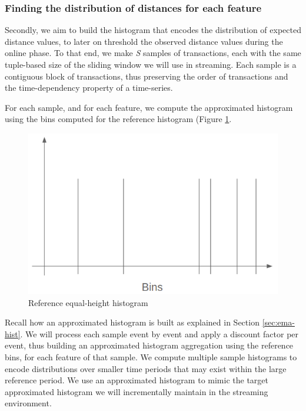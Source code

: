 \subsubsection*{Finding the distribution of distances for each feature} \label{sec:sampling-batch}
Secondly, we aim to build the histogram that encodes the distribution of expected distance values, to later on threshold the observed distance values during the online phase. To that end, we make \textit{S} samples of transactions, each with the same tuple-based size of the sliding window we will use in streaming. Each sample is a contiguous block of transactions, thus preserving the order of transactions and the time-dependency property of a time-series. 

For each sample, and for each feature, we compute the approximated histogram using the bins computed for the reference histogram (Figure \ref{fig:ref-hist-bins}.

\begin{figure}[!htb]
    \begin{center}
      \includegraphics[scale=0.4]{figures/ref-bins.png}
      \caption[]{Reference equal-height histogram}
      \label{fig:ref-hist-bins}
    \end{center}
\end{figure}

Recall how an approximated histogram is built as explained in Section \ref{sec:ema-hist}. We will process each sample event by event and apply a discount factor per event, thus building an approximated histogram aggregation using the reference bins, for each feature of that sample. We compute multiple sample histograms to encode distributions over smaller time periods that may exist within the large reference period. We use an approximated histogram to mimic the target approximated histogram we will incrementally maintain in the streaming environment.

